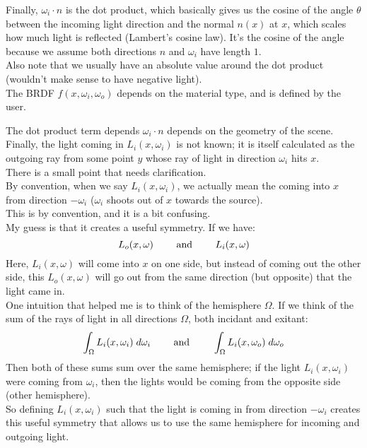 \documentclass[12pt]{article}
\begin{document}
Finally, $\omega_i \cdot n$ is the dot product,
which basically gives us the cosine of the angle $\theta$
between the incoming light direction and the normal
$n(x)$ at $x$, which scales how much light is reflected
(Lambert's cosine law).
It's the cosine of the angle because we 
assume both directions $n$ and $\omega_i$
have length $1$. \\

Also note that we usually have an absolute value
around the dot product (wouldn't make sense to have
negative light). \\

The BRDF $f(x, \omega_i, \omega_o)$ depends on the
material type, and is defined by the user.

The dot product term depends $\omega_i \cdot n$
depends on the geometry of the scene. \\

Finally, the light coming in $L_{i}(x, \omega_i)$
is not known; it is itself calculated
as the outgoing ray from some point $y$
whose ray of light in direction $\omega_i$
hits $x$. \\

There is a small point that needs clarification. \\
By convention, when we say $L_i(x, \omega_i)$,
we actually mean the coming into $x$
from direction $-\omega_i$
($\omega_i$ shoots out of $x$ towards the source). \\
This is by convention, and it is a bit confusing. \\
My guess is that it creates a useful symmetry.
If we have:
\[ L_o(x, \omega) \qquad \text{ and } \qquad L_i(x, \omega) \]
Here, $L_i(x, \omega)$ will come into $x$ on one side,
but instead of coming out the other side,
this $L_o(x, \omega)$ will go out from the same
direction (but opposite) that the light came in. \\
One intuition that helped me is to think of
the hemisphere $\Omega$.
If we think of the sum of the rays of light
in all directions $\Omega$,
both incidant and exitant:
\[ \int_\Omega L_i(x, \omega_i) \; d\omega_i
\qquad \text{ and } \qquad 
\int_\Omega L_i(x, \omega_o) \; d\omega_o \]
Then both of these sums sum over the same
hemisphere; if the light $L_i(x, \omega_i)$
were coming from $\omega_i$,
then the lights would be coming from the
opposite side (other hemisphere). \\
So defining $L_i(x, \omega_i)$
such that the light is coming in from direction
$-\omega_i$ creates this useful
symmetry that allows us to use the same
hemisphere for incoming and outgoing light. \\
\end{document}

